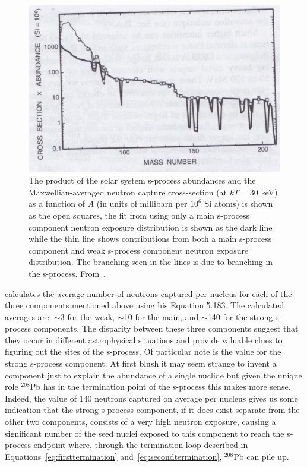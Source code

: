 \begin{figure}
\includegraphics[width=\linewidth]{pdf/lastone.png}
\caption{\label{fig:lastone} The product of the solar system s-process
  abundances and the Maxwellian-averaged neutron capture cross-section
  (at $kT=30$ keV) as a function of $A$ (in units of millibarn per
  $10^6$ Si atoms) is shown as the open squares, the fit from using
  only a main s-process component neutron exposure distribution is
  shown as the dark line while the thin line shows contributions from
  both a main s-process component and weak s-process component neutron
  exposure distribution.  The branching seen in the lines is due to
  branching in the s-process.  From~\cite{kappeleretal2011}.}
\end{figure}

\cite{iliadis2008} calculates the average number of neutrons captured
per nucleus for each of the three components mentioned above using his
Equation 5.183.  The calculated averages are: $\sim$3 for the weak, $\sim$10 for
the main, and $\sim$140 for the strong s-process components.  The disparity
between these three components suggest that they occur in different
astrophysical situations and provide valuable clues to figuring out
the sites of the s-process.  Of particular note is the value for the
strong s-process component.  At first blush it may seem strange to
invent a component just to explain the abundance of a single nuclide
but given the unique role $^{208}$Pb has in the termination point of
the s-process this makes more sense.  Indeed, the value of 140
neutrons captured on average per nucleus gives us some indication that
the strong s-process component, if it does exist separate from the
other two components, consists of a very high neutron exposure,
causing a significant number of the seed nuclei exposed to this
component to reach the s-process endpoint where, through the
termination loop described in Equations~\ref{eq:firsttermination}
and~\ref{eq:secondtermination}, $^{208}$Pb can pile up.

